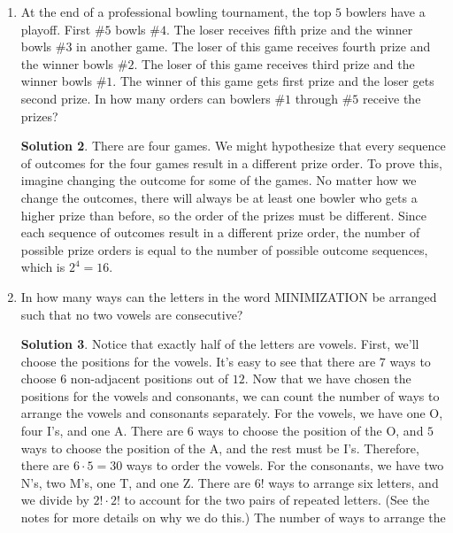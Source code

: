 \documentclass[twocolumn]{article}
\theoremstyle{definition}
\newtheorem*{solution}{Solution}
\begin{document}
\begin{enumerate}
\begin{solution}
        \end{solution}
    \item At the end of a professional bowling tournament, the top $5$ bowlers have a 
        playoff. First \#$5$ bowls \#$4$. The loser receives fifth prize and the winner 
        bowls \#$3$ in another game. The loser of this game receives fourth prize and the 
        winner bowls \#$2$. The loser of this game receives third prize and the winner bowls 
        \#$1$. The winner of this game gets first prize and the loser gets second prize. 
        In how many orders can bowlers \#$1$ through \#$5$ receive the prizes?
        \begin{solution}
            There are four games. We might hypothesize that every sequence of 
            outcomes for the four games result in a different prize order. To 
            prove this, imagine changing the outcome for some of the games. No 
            matter how we change the outcomes, there will always be at least one 
            bowler who gets a higher prize than before, so the order of the 
            prizes must be different. Since each sequence of outcomes result in 
            a different prize order, the number of possible prize orders is 
            equal to the number of possible outcome sequences, which is $2^4 = 
            16$.
        \end{solution}
    \item In how many ways can the letters in the word MINIMIZATION be arranged 
        such that no two vowels are consecutive?
        \begin{solution}
            Notice that exactly half of the letters are vowels. First, we'll 
            choose the positions for the vowels. It's easy to see that there are 
            $7$ ways to choose $6$ non-adjacent positions out of $12$. Now that 
            we have chosen the positions for the vowels and consonants, we can 
            count the number of ways to arrange the vowels and consonants 
            separately. For the vowels, we have one O, four I's, and one A. 
            There are $6$ ways to choose the position of the O, and $5$ ways to 
            choose the position of the A, and the rest must be I's. Therefore, 
            there are $6 \cdot 5 = 30$ ways to order the vowels. For the 
            consonants, we have two N's, two M's, one T, and one Z. There are 
            $6!$ ways to arrange six letters, and we divide by $2! \cdot 2!$ to 
            account for the two pairs of repeated letters. (See the notes for 
            more details on why we do this.) The number of ways to arrange the 

\end{solution}
\end{enumerate}
\end{document}
